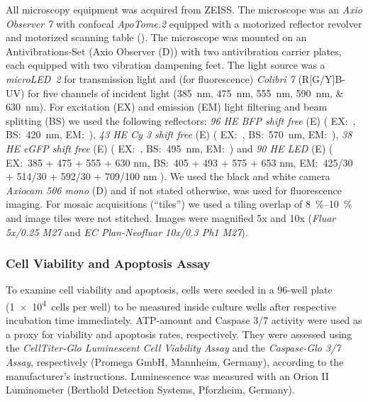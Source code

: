 All microscopy equipment was acquired from
ZEISS. The microscope was an \textit{Axio Observer 7} with confocal
\textit{ApoTome.2} equipped with a motorized reflector revolver and motorized
scanning table (). The microscope was mounted on an
Antivibrations-Set (Axio Observer (D)) with two antivibration carrier plates,
each equipped with two vibration dampening feet. The light source was a
\textit{microLED~2} for transmission light and (for fluorescence)
\textit{Colibri 7} (R[G/Y]B-UV) for five channels of incident light
(\SIlist{385;475;555;590;630}{nm}).
%
For excitation (EX) and
emission (EM) light filtering and beam splitting (BS) we used the following
reflectors:
\textit{96 HE BFP shift free} (E) (%
EX:~,
BS:~\SI{420}{nm},
EM:~),
%
\textit{43 HE Cy 3 shift free} (E) (%
EX:~,
BS:~\SI{570}{nm},
EM:~),
%
\textit{38 HE eGFP shift free} (E) (%
EX:~,
BS:~\SI{495}{nm},
EM:~) and
%
\textit{90 HE LED} (E) (%
EX:~385 + 475 + 555 + 630 \si{nm},
BS:~405 + 493 + 575 + 653 \si{nm},
EM:~425/30 + 514/30 + 592/30 + 709/100 \si{nm}%
).
We used the black and white camera \textit{Axiocam 506 mono} (D) and if not stated
otherwise,  was used for fluorescence imaging. For mosaic
acquisitions (“tiles”) we used a tiling overlap of \SIrange{8}{10}{\percent} and
image tiles were not stitched. Images were magnified 5x and 10x (\textit{Fluar
    5x/0.25 M27} and \textit{EC Plan-Neofluar 10x/0.3 Ph1 M27}).


\subsubsection*{Cell Viability and Apoptosis Assay}
To examine cell viability and apoptosis, cells were seeded in a 96-well plate
(\SI{1e4}{cells} per well) to be measured inside culture wells after respective
incubation time immediately. ATP-amount and Caspase 3/7 activity were used as a
proxy for viability and apoptosis rates, respectively. They were assessed using
the \textit{CellTiter-Glo Luminescent Cell Viability Assay} and the
\textit{Caspase-Glo 3/7 Assay}, respectively (Promega GmbH, Mannheim, Germany),
according to the manufacturer’s instructions. Luminescence was measured with an
Orion II Luminometer (Berthold Detection Systems, Pforzheim, Germany).


